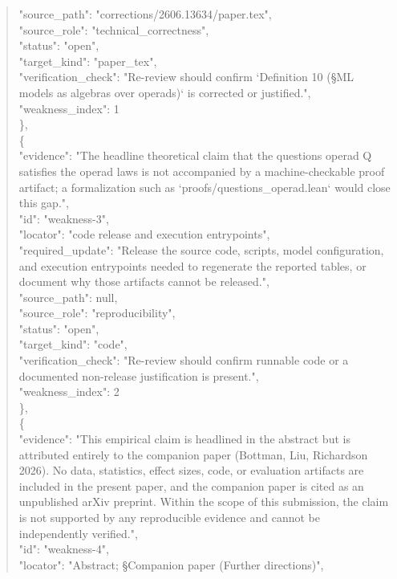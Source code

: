 \documentclass[11pt]{article}
\begin{document}
\begin{quote}
      "source\_path": "corrections/2606.13634/paper.tex",\\
      "source\_role": "technical\_correctness",\\
      "status": "open",\\
      "target\_kind": "paper\_tex",\\
      "verification\_check": "Re-review should confirm `Definition 10 (§ML models as algebras over operads)` is corrected or justified.",\\
      "weakness\_index": 1\\
    \},\\
    \{\\
      "evidence": "The headline theoretical claim that the questions operad Q satisfies the operad laws is not accompanied by a machine-checkable proof artifact; a formalization such as `proofs/questions\_operad.lean` would close this gap.",\\
      "id": "weakness-3",\\
      "locator": "code release and execution entrypoints",\\
      "required\_update": "Release the source code, scripts, model configuration, and execution entrypoints needed to regenerate the reported tables, or document why those artifacts cannot be released.",\\
      "source\_path": null,\\
      "source\_role": "reproducibility",\\
      "status": "open",\\
      "target\_kind": "code",\\
      "verification\_check": "Re-review should confirm runnable code or a documented non-release justification is present.",\\
      "weakness\_index": 2\\
    \},\\
    \{\\
      "evidence": "This empirical claim is headlined in the abstract but is attributed entirely to the companion paper (Bottman, Liu, Richardson 2026). No data, statistics, effect sizes, code, or evaluation artifacts are included in the present paper, and the companion paper is cited as an unpublished arXiv preprint. Within the scope of this submission, the claim is not supported by any reproducible evidence and cannot be independently verified.",\\
      "id": "weakness-4",\\
      "locator": "Abstract; §Companion paper (Further directions)",\\

\end{quote}
\end{document}
